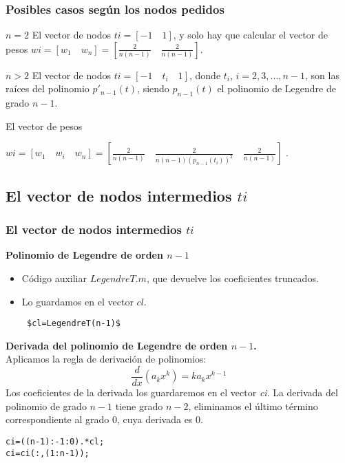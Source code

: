 \documentclass{beamer}
\begin{document}
\begin{frame}
\frametitle{Posibles casos según los nodos pedidos}

\begin{block}{$n=2$}
El vector de nodos $ti=[-1\quad 1]$, y solo hay que calcular el vector de pesos $wi=[w_1\quad w_n]=\left[\tfrac{2}{n(n-1)}\quad \tfrac{2}{n(n-1)}\right]$.
\end{block}

\begin{block}{$n>2$} 
El vector de nodos $ti=[-1\quad t_i \quad 1]$, donde $t_i$, $i=2, 3,...,n-1$, son las raíces del polinomio $p'_{n-1}(t)$, siendo $p_{n-1}(t)$ el polinomio de Legendre de grado $n-1$.

El vector de pesos 

$wi=[w_1 \quad w_i \quad w_n]= \left[\tfrac{2}{n(n-1)} \quad \frac{2}{n(n-1)(p_{n-1}(t_i))^2} \quad \tfrac{2}{n(n-1)}\right]$
.
\end{block}
\end{frame}

\subsection{El vector de nodos intermedios $ti$}
\begin{frame}
\frametitle{El vector de nodos intermedios $ti$}

\textbf{Polinomio de Legendre de orden $n-1$}
\begin{itemize}
    \item Código auxiliar $LegendreT.m$, que devuelve los coeficientes truncados.
    \item Lo guardamos en el vector $cl$.
    \begin{lstlisting} $cl=LegendreT(n-1)$
    \end{lstlisting}
    
\end{itemize}

\vspace{1em}

\textbf{Derivada del polinomio de Legendre de orden $n-1$.}
\\ Aplicamos la regla de derivación de polinomios:
\[
\frac{d}{dx}(a_k x^k)=k a_k x^{k-1}
\]
Los coeficientes de la derivada los guardaremos en el vector \textit{ci}.
La derivada del polinomio de grado $n-1$ tiene grado $n-2$, eliminamos el último término correspondiente al grado 0, cuya derivada es 0.  \begin{lstlisting}
ci=((n-1):-1:0).*cl;
ci=ci(:,(1:n-1));
\end{lstlisting}

\end{frame}
\end{document}
